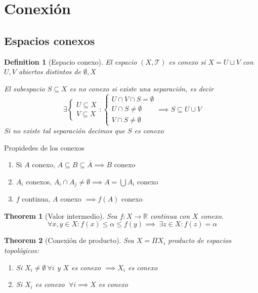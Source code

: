 \documentclass{myclass}
\newtheorem*{definition}{Definition}
\newtheorem*{theorem}{Theorem}
\begin{document}
\section{Conexión}
\subsection{Espacios conexos}
\begin{definition}[Espacio conexo] El espacio $(X, \mathcal{T})$ es conexo si $X = U \sqcup V$ con  $U, V$ abiertos distintos de  $\emptyset, X$

  El subespacio $S\subseteq X$ es no conexo si existe una separación, es decir
  \[
	\ \exists 
  \begin{cases}
   U\subseteq X \\
   V \subseteq X
  \end{cases}
  :
  \begin{cases}
    U \cap V \cap S = \emptyset \\
	U \cap S \neq \emptyset \\
	V \cap S \neq \emptyset
  \end{cases}
  \implies S\subseteq U \cup V
  \] 
  Si no existe tal separación decimos que $S$ es conexo
\end{definition}

Propidedes de los conexos
  \begin{enumerate}[topsep=-6pt, itemsep=0pt]
    \item Si $A$ conexo,  $A\subseteq B\subseteq \overline{A} \implies B$ conexo
	\item $A_i$ conexos,  $A_i\cap A_j \neq \emptyset \implies A = \bigcup A_i$ conexo  
	\item $f$ continua, $A$ conexo  $\implies f(A)$ conexo
  \end{enumerate}

\begin{theorem}[Valor intermedio] Sea $f:X \to \mathbb{R}$ continua con $X$ conexo.
  \[
  \ \forall x, y \in X : f(x)\le \alpha \le f(y) \implies \ \exists z \in X : f(z) = \alpha 
  \] 
\end{theorem}

\begin{theorem}[Conexión de producto] Sea $X = \Pi X_i$ producto de espacios topológicos:
   \begin{enumerate}[topsep=-6pt, itemsep=0pt]
    \item Si $X_i\neq \emptyset \ \forall i$ y $X$ es conexo  $\implies X_i$ es conexo
	\item Si $X_i$ es conexo  $\ \forall i \implies X$ es conexo
  \end{enumerate}
\end{theorem}
\end{document}
